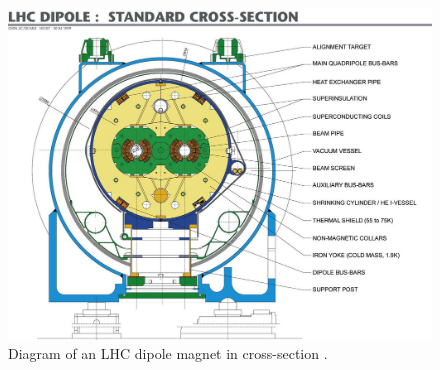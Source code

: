 \begin{figure}[hbtp]
\centering
\includegraphics[scale=0.5]{figures/lhc_and_cms/lhc_dipole.jpg}
\caption{Diagram of an LHC dipole magnet in cross-section \cite{lhc_dipole}.}
\label{lhc_dipole}
\end{figure}